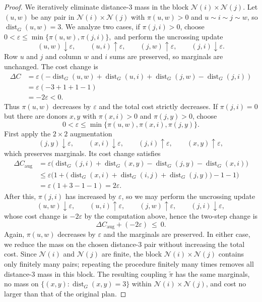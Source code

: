 \documentclass[twoside,11pt]{article}
\numberwithin{equation}{section}
\numberwithin{theorem}{section}
\numberwithin{example}{section}
\begin{document}
\begin{proof}
We iteratively eliminate distance-$3$ mass in the block $\mathcal N(i)\times\mathcal N(j)$. Let $(u,w)$ be any pair in $\mathcal N(i)\times\mathcal N(j)$ with $\pi(u,w)>0$ and $u\sim i\sim j\sim w$, so $\operatorname{dist}_G(u,w)=3$. We analyze two cases, if $\pi(j,i)>0$, choose 
\(
0<\varepsilon\le \min\{\pi(u,w),\pi(j,i)\},
\)
and perform the uncrossing update
\[
(u,w)\downarrow \varepsilon,\qquad
(u,i)\uparrow \varepsilon,\qquad
(j,w)\uparrow \varepsilon,\qquad
(j,i)\downarrow \varepsilon.
\]
Row $u$ and $j$ and column $w$ and $i$ sums are preserved, so marginals are unchanged. The cost change is
\[
\begin{aligned}
\Delta C
&=
\varepsilon\!\left(-\operatorname{dist}_G(u,w)+\operatorname{dist}_G(u,i)+\operatorname{dist}_G(j,w)-\operatorname{dist}_G(j,i)\right)
\\
&=
\varepsilon(-3+1+1-1)
\\
&=-2\varepsilon<0.
\end{aligned}
\]
Thus $\pi(u,w)$ decreases by $\varepsilon$ and the total cost strictly decreases. If $\pi(j,i)=0$ but there are donors $x,y$ with $\pi(x,i)>0$ and $\pi(j,y)>0$, choose
\[
0<\varepsilon\le \min\{\pi(u,w),\pi(x,i),\pi(j,y)\}.
\]
First apply the $2\times 2$ augmentation
\[
(j,y)\downarrow \varepsilon,\qquad (x,i)\downarrow \varepsilon,\qquad
(j,i)\uparrow \varepsilon,\qquad (x,y)\uparrow \varepsilon,
\]
which preserves marginals. Its cost change satisfies
\[
\begin{aligned}
\Delta C_{\mathrm{aug}}
&= \varepsilon\Big(\operatorname{dist}_G(j,i)+\operatorname{dist}_G(x,y)-\operatorname{dist}_G(j,y)-\operatorname{dist}_G(x,i)\Big) \\
&\le \varepsilon\Big(1+\big(\operatorname{dist}_G(x,i)+\operatorname{dist}_G(i,j)+\operatorname{dist}_G(j,y)\big)-1-1\Big)\\
&= \varepsilon(1+3-1-1)=2\varepsilon.
\end{aligned}
\]
After this, $\pi(j,i)$ has increased by $\varepsilon$, so we may perform the uncrossing update
\[
(u,w)\downarrow \varepsilon,\qquad
(u,i)\uparrow \varepsilon,\qquad
(j,w)\uparrow \varepsilon,\qquad
(j,i)\downarrow \varepsilon,
\]
whose cost change is $-2\varepsilon$ by the computation above, hence the two-step change is
\[
\Delta C_{\mathrm{aug}} + (-2\varepsilon)\ \le\ 0.
\]
Again, $\pi(u,w)$ decreases by $\varepsilon$ and the marginals are preserved. In either case, we reduce the mass on the chosen distance-$3$ pair without increasing the total cost.  Since $\mathcal N(i)$ and $\mathcal N(j)$ are finite, the block $\mathcal N(i)\times\mathcal N(j)$ contains only finitely many pairs; repeating the procedure finitely many times removes all distance-$3$ mass in this block.  The resulting coupling $\widetilde\pi$ has the same marginals, no mass on $\{(x,y):\operatorname{dist}_G(x,y)=3\}$ within $\mathcal N(i)\times\mathcal N(j)$, and cost no larger than that of the original plan.
\end{proof}
\end{document}
